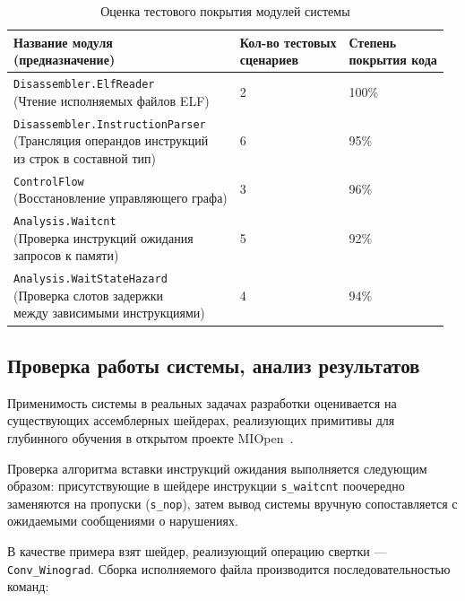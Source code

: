 \documentclass[a4paper,14pt]{extarticle}
\begin{document}
{\begin{table}[H]
\caption{Оценка тестового покрытия модулей системы}
\label{table:test-coverage}
\begin{tabular}{|l|l|l|}
\hline
\thead{Название модуля \\ (предназначение)} & \thead{Кол-во тестовых \\ сценариев} & \thead{Степень \\ покрытия кода} \\\hline
\makecell[l]{\texttt{Disassembler.ElfReader}\\[2mm] (Чтение исполняемых файлов ELF)} & 2 & 100\% \\\hline
\makecell[l]{\texttt{Disassembler.InstructionParser}\\[2mm] (Трансляция операндов инструкций\\из строк в составной тип)} & 6 & 95\% \\\hline
\makecell[l]{\texttt{ControlFlow}\\[2mm] (Восстановление управляющего графа)} & 3 & 96\% \\\hline
  \makecell[l]{\texttt{Analysis.Waitcnt}\\[2mm] (Проверка инструкций ожидания\\запросов к памяти)} & 5 & 92\% \\\hline
\makecell[l]{\texttt{Analysis.WaitStateHazard}\\[2mm] (Проверка слотов задержки\\между зависимыми инструкциями)} & 4 & 94\% \\\hline
\end{tabular}
\end{table}

\subsection{Проверка работы системы, анализ результатов}

Применимость системы в реальных задачах разработки оценивается на существующих
ассемблерных шейдерах, реализующих примитивы для глубинного обучения
в открытом проекте MIOpen~\cite{miopen}.

Проверка алгоритма вставки инструкций ожидания выполняется следующим образом:
присутствующие в шейдере инструкции \verb|s_waitcnt| поочередно заменяются на
пропуски (\verb|s_nop|), затем вывод системы вручную сопоставляется с ожидаемыми
сообщениями о нарушениях.

В качестве примера взят шейдер, реализующий операцию свертки — \verb|Conv_Winograd|.
Сборка исполняемого файла производится последовательностью команд:

}
\end{document}
